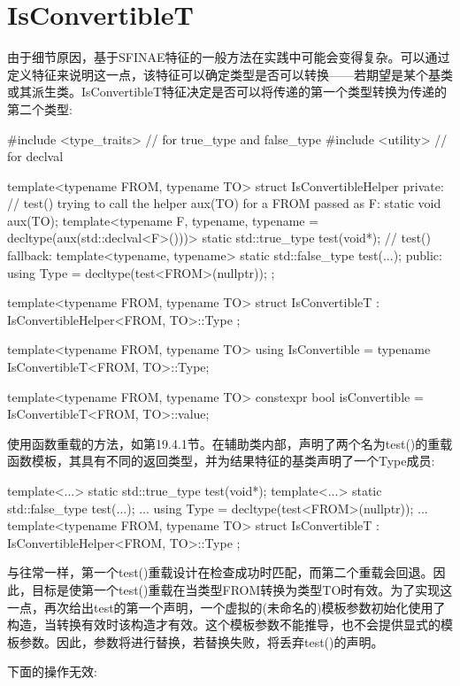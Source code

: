 \section{IsConvertibleT}
由于细节原因，基于SFINAE特征的一般方法在实践中可能会变得复杂。可以通过定义特征来说明这一点，该特征可以确定类型是否可以转换——若期望是某个基类或其派生类。IsConvertibleT特征决定是否可以将传递的第一个类型转换为传递的第二个类型:

\begin{cpp}
#include <type_traits> // for true_type and false_type
#include <utility> // for declval

template<typename FROM, typename TO>
struct IsConvertibleHelper {
	private:
	// test() trying to call the helper aux(TO) for a FROM passed as F:
		static void aux(TO);
	template<typename F, typename,
	typename = decltype(aux(std::declval<F>()))>
		static std::true_type test(void*);
	// test() fallback:
	template<typename, typename>
		static std::false_type test(...);
	public:
	using Type = decltype(test<FROM>(nullptr));
};

template<typename FROM, typename TO>
struct IsConvertibleT : IsConvertibleHelper<FROM, TO>::Type {
};

template<typename FROM, typename TO>
using IsConvertible = typename IsConvertibleT<FROM, TO>::Type;

template<typename FROM, typename TO>
constexpr bool isConvertible = IsConvertibleT<FROM, TO>::value;
\end{cpp}

使用函数重载的方法，如第19.4.1节。在辅助类内部，声明了两个名为test()的重载函数模板，其具有不同的返回类型，并为结果特征的基类声明了一个Type成员:

\begin{cpp}
template<...> static std::true_type test(void*);
template<...> static std::false_type test(...);
...
using Type = decltype(test<FROM>(nullptr));
...
template<typename FROM, typename TO>
struct IsConvertibleT : IsConvertibleHelper<FROM, TO>::Type {
};
\end{cpp}

与往常一样，第一个test()重载设计在检查成功时匹配，而第二个重载会回退。因此，目标是使第一个test()重载在当类型FROM转换为类型TO时有效。为了实现这一点，再次给出test的第一个声明，一个虚拟的(未命名的)模板参数初始化使用了构造，当转换有效时该构造才有效。这个模板参数不能推导，也不会提供显式的模板参数。因此，参数将进行替换，若替换失败，将丢弃test()的声明。

下面的操作无效:

